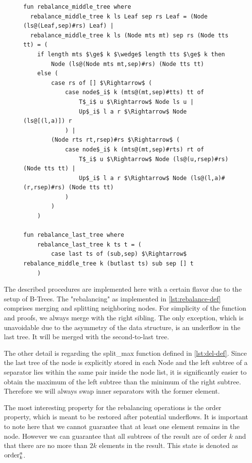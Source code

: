 \begin{figure}
\begin{lstlisting}[mathescape=true, language=Isabelle,label={lst:rebalance-def},
    caption={The rebalancing functions}]
fun rebalance_middle_tree where
  rebalance_middle_tree k ls Leaf sep rs Leaf = (Node (ls@(Leaf,sep)#rs) Leaf) |
  rebalance_middle_tree k ls (Node mts mt) sep rs (Node tts tt) = (
    if length mts $\ge$ k $\wedge$ length tts $\ge$ k then
        Node (ls@(Node mts mt,sep)#rs) (Node tts tt)
    else (
        case rs of [] $\Rightarrow$ (
            case node$_i$ k (mts@(mt,sep)#tts) tt of
                T$_i$ u $\Rightarrow$ Node ls u |
                Up$_i$ l a r $\Rightarrow$ Node (ls@[(l,a)]) r
            ) |
        (Node rts rt,rsep)#rs $\Rightarrow$ (
            case node$_i$ k (mts@(mt,sep)#rts) rt of
                T$_i$ u $\Rightarrow$ Node (ls@(u,rsep)#rs) (Node tts tt) |
                Up$_i$ l a r $\Rightarrow$ Node (ls@(l,a)#(r,rsep)#rs) (Node tts tt)
            )
        )
    )

fun rebalance_last_tree where
    rebalance_last_tree k ts t = (
        case last ts of (sub,sep) $\Rightarrow$ rebalance_middle_tree k (butlast ts) sub sep [] t
    )
\end{lstlisting}
\end{figure}

The described procedures are implemented here with a
certain flavor due to the setup of B-Trees.
The "rebalancing" as implemented in \autoref{lst:rebalance-def}
comprises merging and splitting neighboring nodes.
For simplicity of the function and proofs, we always
merge with the right sibling.
The only exception, which is unavoidable due to the asymmetry of the data structure,
is an underflow in the last tree.
It will be merged with the second-to-last tree.

The other detail is regarding the split\_max function
defined in \autoref{lst:del-def}.
Since the last tree of the node is explicitly stored in each Node
and the left subtree of a separator lies within the same
pair inside the node list, it is significantly
easier to obtain the maximum of the left subtree
than the minimum of the right subtree.
Therefore we will always swap inner separators with the former element.

The most interesting property for the rebalancing operations is the order property,
which is meant to be restored after potential underflows.
It is important to note here that we cannot guarantee
that at least one element remains in the node.
However we can guarantee that all subtrees of the result are of order $k$
and that there are no more than $2k$ elements in the result.
This state is denoted as $\operatorname{order}^a_k$.

